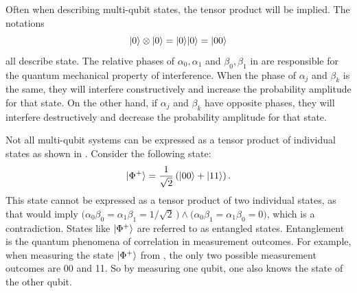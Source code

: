 Often when describing multi-qubit states, the tensor product will be implied.
The notations
\begin{equation}
\vert{0}\rangle \otimes \vert{0}\rangle = \vert{0}\rangle\vert{0}\rangle = \vert{00}\rangle
\end{equation}
all describe state.
The relative phases of $\alpha_0, \alpha_1$ and $\beta_0, \beta_1$ in  are responsible for the quantum mechanical property of interference.
When the phase of $\alpha_j$ and $\beta_k$ is the same, they will interfere constructively and increase the probability amplitude for that state.
On the other hand, if $\alpha_j$ and $\beta_k$ have opposite phases, they will interfere destructively and decrease the probability amplitude for that state.

Not all multi-qubit systems can be expressed as a tensor product of individual states as shown in .
Consider the following state:
\begin{equation} \label{eqn:bell-state}
\vert{\Phi^+}\rangle = \dfrac{1}{\sqrt{2}}\left(\vert{00}\rangle + \vert{11}\rangle\right).
\end{equation}
This state cannot be expressed as a tensor product of two individual states, as that would imply $\Big(\alpha_0\beta_0 = \alpha_1\beta_1 = 1/\sqrt2\,\Big) \wedge \Big(\alpha_0\beta_1 = \alpha_1\beta_0 = 0\Big)$, which is a contradiction.
States like $\vert{\Phi^+}\rangle$ are referred to as entangled states.
Entanglement is the quantum phenomena of correlation in measurement outcomes.
For example, when measuring the state $\vert{\Phi^+}\rangle$ from , the only two possible measurement outcomes are 00 and 11.
So by measuring one qubit, one also knows the state of the other qubit.

